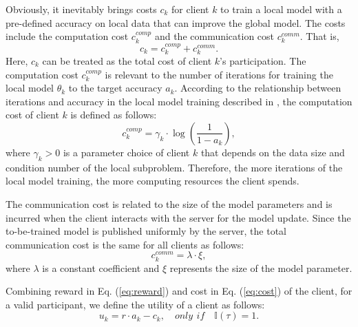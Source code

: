 \documentclass[final,1p,times]{elsarticle}
\begin{document}
Obviously, it inevitably brings costs $c_k$ for client $k$ to train a local model with a pre-defined accuracy on local data that can improve the global model. The costs include the computation cost $c_k^{comp}$ and the communication cost $c_k^{comm}$. That is, 
\begin{equation}\label{eq:cost}
	c_k	= c_k^{comp} + c_k^{comm}.
\end{equation}
Here, $c_k$ can be treated as the total cost of client $k$'s participation. The computation cost $c_k^{comp}$ is relevant to the number of iterations for training the local model $\theta_k$ to the target accuracy $a_k$. According to the relationship between iterations and accuracy in the local model training described in \citep{pandey2020crowdsourcing}, the computation cost of client $k$ is defined as follows:
\begin{equation}
	c_k^{comp} = \gamma_k\cdot \log(\frac{1}{1-a_k}),
\end{equation}
where $\gamma_k>0$ is a parameter choice of client $k$ that depends on the data size and condition number of the local subproblem. Therefore, the more iterations of the local model training, the more computing resources the client spends.

The communication cost is related to the size of the model parameters and is incurred when the client interacts with the server for the model update. Since the to-be-trained model is published uniformly by the server, the total communication cost is the same for all clients as follows:
\begin{equation}
	c_k^{comm} = \lambda\cdot\xi,
\end{equation}
where $\lambda$ is a constant coefficient and $\xi$ represents the size of the model parameter.

Combining reward in Eq. (\ref{eq:reward}) and cost in Eq. (\ref{eq:cost}) of the client, for a valid participant, we define the utility of a client as follows:
\begin{equation}
	u_k = r\cdot a_k - c_k, \quad only\,\: if\quad\mathbb{I}(\tau) = 1.
\end{equation}
\end{document}
